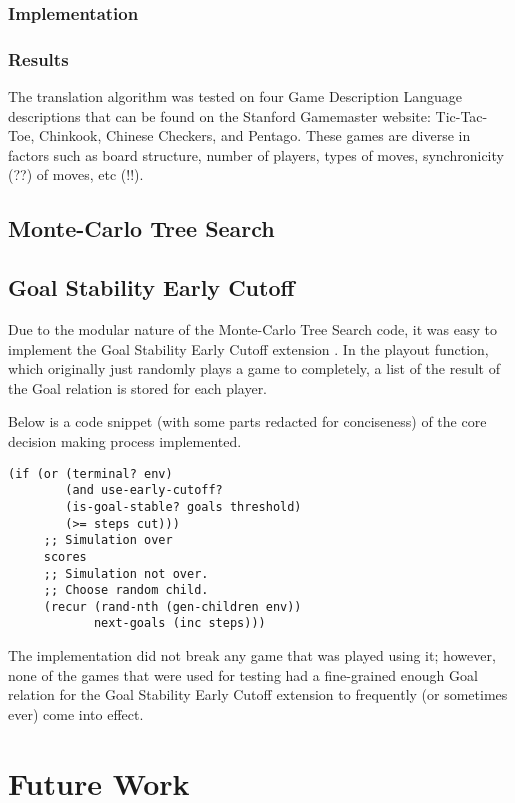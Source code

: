 \documentclass[letterpaper]{article}
\begin{document}
\subsubsection{Implementation}

\subsubsection{Results}
The translation algorithm was tested on four Game Description Language descriptions that can be found on the Stanford Gamemaster website: Tic-Tac-Toe, Chinkook, Chinese Checkers, and Pentago. These games are diverse in factors such as board structure, number of players, types of moves, synchronicity (??) of moves, etc (!!).

\subsection{Monte-Carlo Tree Search}

\subsection{Goal Stability Early Cutoff}
Due to the modular nature of the Monte-Carlo Tree Search code, it was easy to implement the Goal Stability Early Cutoff extension \cite{finnsson2012generalized}. In the playout function, which originally just randomly plays a game to completely, a list of the result of the Goal relation is stored for each player.

Below is a code snippet (with some parts redacted for conciseness) of the core decision making process implemented.
\begin{lstlisting}[frame=single,caption=Clojure implementation of Goal Stability Early Cutoff]
(if (or (terminal? env)
        (and use-early-cutoff?
        (is-goal-stable? goals threshold)
        (>= steps cut)))
     ;; Simulation over
     scores
     ;; Simulation not over.
     ;; Choose random child.
     (recur (rand-nth (gen-children env)) 
            next-goals (inc steps)))
\end{lstlisting}

The implementation did not break any game that was played using it; however, none of the games that were used for testing had a fine-grained enough Goal relation for the Goal Stability Early Cutoff extension to frequently (or sometimes ever) come into effect.

\section{Future Work}
\end{document}
